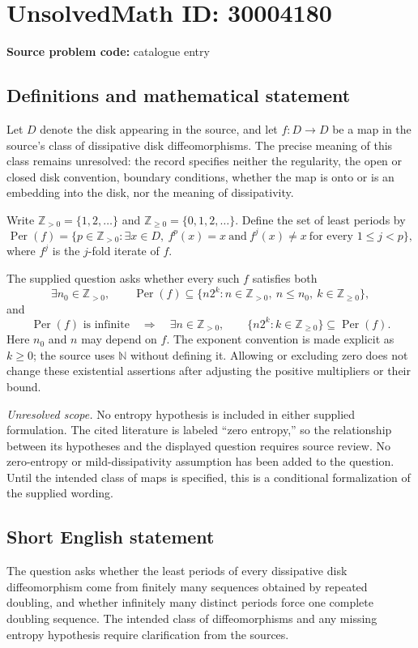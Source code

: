 \documentclass[11pt]{article}
\newcommand{\Z}{\mathbb{Z}}
\begin{document}
\section*{UnsolvedMath ID: 30004180}
\textbf{Source problem code:} catalogue entry
\subsection{Definitions and mathematical statement}
Let \(D\) denote the disk appearing in the source, and let \(f\colon D\to D\) be a map in the source's class of dissipative disk diffeomorphisms. The precise meaning of this class remains unresolved: the record specifies neither the regularity, the open or closed disk convention, boundary conditions, whether the map is onto or is an embedding into the disk, nor the meaning of dissipativity.

Write \(\Z_{>0}=\{1,2,\ldots\}\) and \(\Z_{\geq0}=\{0,1,2,\ldots\}\). Define the set of least periods by
\[
\operatorname{Per}(f)=\bigl\{p\in\Z_{>0}:\exists x\in D,\ f^p(x)=x\ \text{and}\ f^j(x)\ne x\ \text{for every }1\leq j<p\bigr\},
\]
where \(f^j\) is the \(j\)-fold iterate of \(f\).

The supplied question asks whether every such \(f\) satisfies both
\[
\exists n_0\in\Z_{>0},\qquad
\operatorname{Per}(f)\subseteq
\{n2^k:n\in\Z_{>0},\ n\leq n_0,\ k\in\Z_{\geq0}\},
\]
and
\[
\operatorname{Per}(f)\text{ is infinite}
\quad\Longrightarrow\quad
\exists n\in\Z_{>0},\qquad
\{n2^k:k\in\Z_{\geq0}\}\subseteq\operatorname{Per}(f).
\]
Here \(n_0\) and \(n\) may depend on \(f\). The exponent convention is made explicit as \(k\geq0\); the source uses \(\mathbb N\) without defining it. Allowing or excluding zero does not change these existential assertions after adjusting the positive multipliers or their bound.

\textit{Unresolved scope.} No entropy hypothesis is included in either supplied formulation. The cited literature is labeled ``zero entropy,'' so the relationship between its hypotheses and the displayed question requires source review. No zero-entropy or mild-dissipativity assumption has been added to the question. Until the intended class of maps is specified, this is a conditional formalization of the supplied wording.
\subsection{Short English statement}
The question asks whether the least periods of every dissipative disk diffeomorphism come from finitely many sequences obtained by repeated doubling, and whether infinitely many distinct periods force one complete doubling sequence. The intended class of diffeomorphisms and any missing entropy hypothesis require clarification from the sources.
\end{document}
